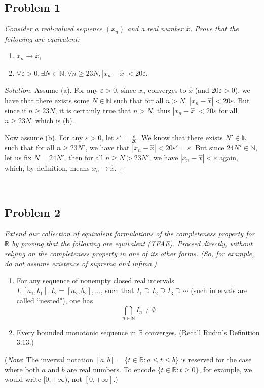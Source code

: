 \documentclass{article}
\newcommand{\N}{{\mathbb N}}
\newcommand{\R}{{\mathbb R}}
\newcommand{\ep}{{\varepsilon}}
\begin{document}
\subsection*{Problem 1}
{\it Consider a real-valued sequence $(x_n)$ and a real number $\hat{x}$.
	Prove that the following are equivalent:
\begin{enumerate}
	\item $x_n \to \hat{x}$,
	\item $\forall \ep > 0, \exists N \in \N \colon
		\forall n \geq 23N, |x_n - \hat{x}| < 20\ep$.
\end{enumerate}}

\begin{proof}[Solution]\let\qed\relax
	Assume (a).
	For any $\ep > 0$,
	since $x_n$ converges to $\hat{x}$ (and $20\ep>0$),
	we have that there exists some $N \in \N$
	such that for all $n > N$,
	$|x_n - \hat{x}| < 20 \ep$.
	But since if $n \geq 23N$, it is certainly true that $n > N$,
	thus $|x_n - \hat{x}| < 20\ep$ for all $n \geq 23N$,
	which is (b).

	Now assume (b).
	For any $\ep > 0$,
	let $\ep' = \frac{\ep}{20}$.
	We know that there exists $N' \in \N$
	such that for all $n \geq 23N'$,
	we have that $|x_n - \hat{x}| < 20\ep' = \ep$.
	But since $24N' \in \N$,
	let us fix $N = 24N'$,
	then for all $n \geq N > 23N'$, we have
	$|x_n - \hat{x}| < \ep$ again,
	which, by definition, means $x_n \to \hat{x}$.
\end{proof}
\clearpage
~\clearpage

\subsection*{Problem 2}
{\it Extend our collection of equivalent formulations of
the completeness property for $\R$ by proving
that the following are equivalent (TFAE).
Proceed directly, without relying on the completeness property in one of its other forms.
(So, for example, do not assume existence of suprema and infima.)
\begin{enumerate}
	\item For any sequence of nonempty closed real intervals
		$I_1 [a_1,b_1], I_2=[a_2,b_2], \dots$,
		such that $I_1 \supseteq I_2 \supseteq I_3 \supseteq \cdots$
		(such intervals are called ``nested"), one has
		\[
			\bigcap_{n\in\N} I_n \neq \emptyset
		\]
	\item Every bounded monotonic sequence in $\R$ converges.
		(Recall Rudin's Definition 3.13.)
\end{enumerate}
(\emph{Note}: The inverval notation $[a,b] = \{t \in \R\colon a \leq t \leq b\}$
is reserved for the case where both $a$ and $b$ are real numbers.
To encode $\{t \in \R \colon t \geq 0\}$, for example,
we would write $[0,+\infty)$, not $[0,+\infty]$.)}
\end{document}
